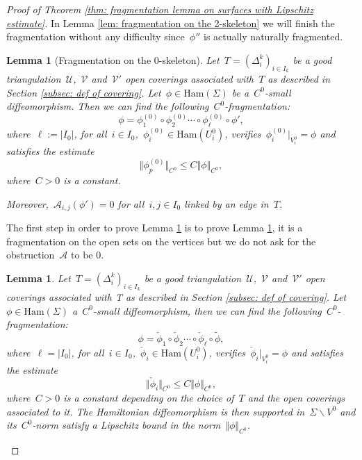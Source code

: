 \documentclass[10pt]{amsart}
\newtheorem{lemma}[prop]{Lemma}
\newcommand{\Ham}{\mathrm{Ham}}
\begin{document}
\begin{proof}[Proof of Theorem \ref{thm: fragmentation lemma on surfaces with Lipschitz estimate}]
In Lemma \ref{lem: fragmentation on the 2-skeleton} we will finish the fragmentation without any difficulty since~$\phi''$ is actually naturally fragmented.

\begin{lemma}[Fragmentation on the 0-skeleton]\label{lem: fragmentation on the 0-skeleton}
Let~$T=(\Delta_i^k)_{i\in I_k}$ be a good triangulation~$\mathcal{U}$,~$\mathcal{V}$ and~$\mathcal{V}'$ open coverings associated with~$T$ as described in Section \ref{subsec: def of covering}. Let~$\phi\in \Ham(\Sigma)$ be a~$C^0$-small diffeomorphism. Then we can find the following~$C^0$-fragmentation:
$$\phi=\phi_1^{(0)} \circ \phi_2^{(0)} \cdots \circ 
\phi_{\ell}^{(0)}\circ \phi',$$
where~$\ell:=\vert I_0 \vert$, for all~$i \in I_0$,~$\phi_i^{(0)}\in\Ham(U_i^0)$, verifies~$\phi_i^{(0)}\vert_{V^0_i}=\phi$ and satisfies the estimate 
$$\Vert \phi_p^{(0)} \Vert_{C^0}\leq C \Vert \phi \Vert_{C^0},$$
where~$C>0$ is a constant.

Moreover,~$\mathcal{A}_{i,j}(\phi')=0$ for all~$i,j \in I_0$ linked by an edge in~$T$.
\end{lemma}

The first step in order to prove Lemma \ref{lem: fragmentation on the 0-skeleton} is to prove Lemma \ref{sublemma: naive fragmentation on the 0-skeleton}, it is a fragmentation on the open sets on the vertices but we do not ask for the obstruction~$\mathcal{A}$ to be 0.

\begin{lemma}\label{sublemma: naive fragmentation on the 0-skeleton}
Let~$T=(\Delta_i^k)_{i\in I_k}$ be a good triangulation~$\mathcal{U}$,~$\mathcal{V}$ and~$\mathcal{V}'$ open coverings associated with T as described in Section \ref{subsec: def of covering}. Let~$\phi\in \Ham(\Sigma)$ a~$C^0$-small diffeomorphism, then we can find the following~$C^0$-fragmentation:
$$\phi=\check{\phi}_1 \circ \check\phi_2 \cdots \circ 
\check\phi_{\ell}\circ \widetilde{\phi},$$
where~$\ell=\vert I_0 \vert$, for all~$i \in I_0$,~$\check\phi_i\in \Ham(U_i^0)$, verifies~$\check\phi_i\vert_{V^0_i}=\phi$ and satisfies the estimate 
$$\Vert \check \phi_i \Vert_{C^0}\leq C \Vert \phi \Vert_{C^0},$$
where~$C>0$ is a constant depending on the choice of~$T$ and the open coverings associated to it. The Hamiltonian diffeomorphism \smash[t]{$\widetilde{\phi}$} is then supported in~$\Sigma \backslash V^0$ and its~$C^0$-norm satisfy a Lipschitz bound in the norm~$\Vert\phi \Vert_{C^0}$.
\end{lemma}


\end{proof}
\end{document}
